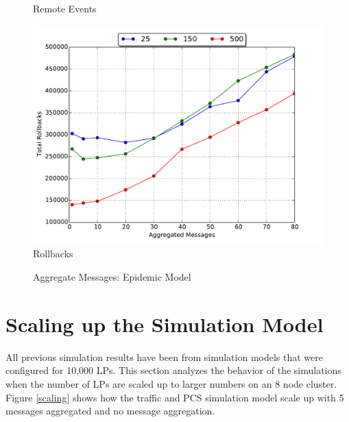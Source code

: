 \documentclass[11pt]{book}
\begin{document}
\begin{figure}
\begin{minipage}{.5\textwidth}
\begin{center}
      Remote Events \\
    \end{center}
  \end{minipage}%
  \hfill
  \begin{minipage}{.5\textwidth}
    \begin{center}
      \includegraphics[width=\textwidth,keepaspectratio,quiet]{figs/partitioning_communication/aggregate_epidemic_rollbacks.pdf} \\
      Rollbacks \\
    \end{center}
  \end{minipage}
  \caption{Aggregate Messages: Epidemic Model}\label{aggregate_epidemic}
\end{figure}

\section{Scaling up the Simulation Model}

All previous simulation results have been from simulation models that were configured for
10,000 LPs. This section analyzes the behavior of the simulations when the number of LPs are
scaled up to larger numbers on an 8 node cluster. Figure \ref{scaling} shows how the traffic
and PCS simulation model scale up with 5 messages aggregated and no message aggregation.
\end{document}
